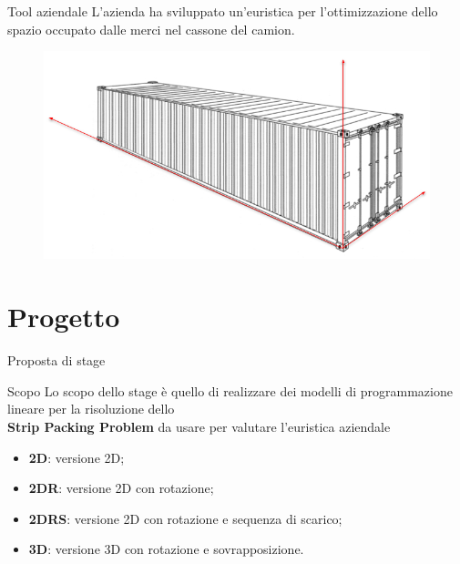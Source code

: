 \documentclass{beamer}
\begin{document}
\begin{frame}{Tool aziendale}
	L'azienda ha sviluppato un'euristica per l'ottimizzazione dello spazio occupato dalle merci nel cassone del camion.
	\begin{figure}[H]
		\begin{center} \includegraphics[width=1\linewidth]{figures/container_arrows}
		\end{center}
	\end{figure}
\end{frame}

\section{Progetto}
\begin{frame}{Proposta di stage}
	\begin{alertblock}{Scopo}
		Lo scopo dello stage \`e  quello di realizzare dei modelli di programmazione lineare per la risoluzione dello \\ \textbf{Strip Packing Problem} da usare per valutare l'euristica aziendale
	\end{alertblock}
	\begin{itemize}
		\item \textbf{2D}: versione 2D;
		\item \textbf{2DR}: versione 2D con rotazione;
		\item \textbf{2DRS}: versione 2D con rotazione e sequenza di scarico;
		\item \textbf{3D}: versione 3D con rotazione e sovrapposizione.
	\end{itemize}
\end{frame}
\end{document}
